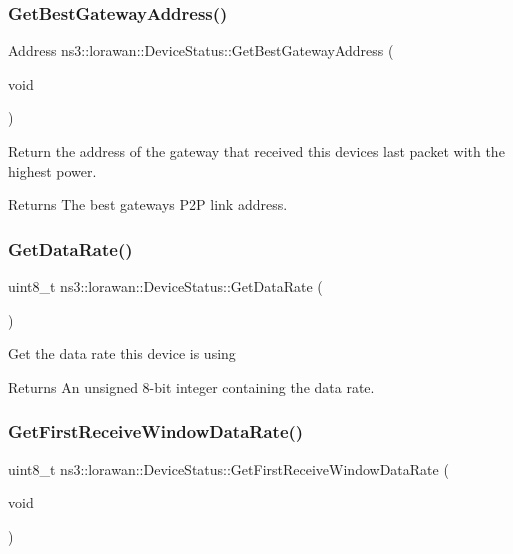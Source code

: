 \subsubsection{\texorpdfstring{Get\+Best\+Gateway\+Address()}{GetBestGatewayAddress()}}
{\footnotesize\ttfamily Address ns3\+::lorawan\+::\+Device\+Status\+::\+Get\+Best\+Gateway\+Address (\begin{DoxyParamCaption}\item[{void}]{ }\end{DoxyParamCaption})}

Return the address of the gateway that received this device\textquotesingle{}s last packet with the highest power.

\begin{DoxyReturn}{Returns}
The best gateway\textquotesingle{}s P2P link address. 
\end{DoxyReturn}
\mbox{\label{classns3_1_1lorawan_1_1DeviceStatus_af0d05320ecdc282c13597c101076c605}} 
\subsubsection{\texorpdfstring{Get\+Data\+Rate()}{GetDataRate()}}
{\footnotesize\ttfamily uint8\+\_\+t ns3\+::lorawan\+::\+Device\+Status\+::\+Get\+Data\+Rate (\begin{DoxyParamCaption}{ }\end{DoxyParamCaption})}

Get the data rate this device is using

\begin{DoxyReturn}{Returns}
An unsigned 8-\/bit integer containing the data rate. 
\end{DoxyReturn}
\mbox{\label{classns3_1_1lorawan_1_1DeviceStatus_a4645606cdd1fd2f4c94d1f8ec919f49f}} 
\subsubsection{\texorpdfstring{Get\+First\+Receive\+Window\+Data\+Rate()}{GetFirstReceiveWindowDataRate()}}
{\footnotesize\ttfamily uint8\+\_\+t ns3\+::lorawan\+::\+Device\+Status\+::\+Get\+First\+Receive\+Window\+Data\+Rate (\begin{DoxyParamCaption}\item[{void}]{ }\end{DoxyParamCaption})}

